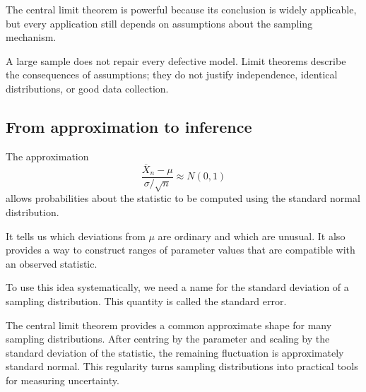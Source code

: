 The central limit theorem is powerful because its conclusion is widely
applicable, but every application still depends on assumptions about the sampling
mechanism.

\begin{remarkbox}
A large sample does not repair every defective model. Limit theorems describe the
consequences of assumptions; they do not justify independence, identical
distributions, or good data collection.
\end{remarkbox}

\subsection*{From approximation to inference}

The approximation
\[
\frac{\overline X_n-\mu}{\sigma/\sqrt n}
\approx N(0,1)
\]
allows probabilities about the statistic to be computed using the standard
normal distribution.

It tells us which deviations from \(\mu\) are ordinary and which are unusual. It
also provides a way to construct ranges of parameter values that are compatible
with an observed statistic.

To use this idea systematically, we need a name for the standard deviation of a
sampling distribution. This quantity is called the standard error.

\begin{summarybox}
The central limit theorem provides a common approximate shape for many sampling
distributions. After centring by the parameter and scaling by the standard
deviation of the statistic, the remaining fluctuation is approximately standard
normal. This regularity turns sampling distributions into practical tools for
measuring uncertainty.
\end{summarybox}
